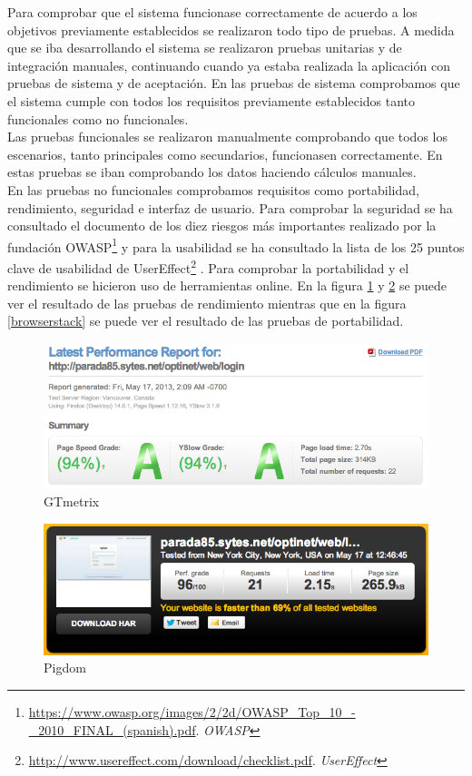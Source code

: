 \documentclass[a4paper,12pt]{article}
\begin{document}
\noindent Para comprobar que el sistema funcionase correctamente de acuerdo a los objetivos previamente establecidos se realizaron todo tipo de pruebas. A medida que se iba desarrollando el sistema se realizaron pruebas unitarias y de integración manuales, continuando cuando ya estaba realizada la aplicación con pruebas de sistema y de aceptación. En las pruebas de sistema comprobamos que el sistema cumple con todos los requisitos previamente establecidos tanto funcionales como no funcionales.\\
Las pruebas funcionales se realizaron manualmente comprobando que todos los escenarios, tanto principales como secundarios, funcionasen correctamente. En estas pruebas se iban comprobando los datos haciendo cálculos manuales.\\
En las pruebas no funcionales comprobamos requisitos como portabilidad, rendimiento, seguridad e interfaz de usuario. Para comprobar la seguridad se ha consultado el documento de los diez riesgos más importantes realizado por la fundación OWASP\footnote{\url{https://www.owasp.org/images/2/2d/OWASP_Top_10_-_2010_FINAL_(spanish).pdf}. \textit{OWASP}} y para la usabilidad se ha consultado la lista de los 25 puntos clave de usabilidad de UserEffect\footnote{\url{http://www.usereffect.com/download/checklist.pdf}. \textit{UserEffect}} . Para comprobar la portabilidad y el rendimiento se hicieron uso de herramientas online. En la figura \ref{gtmetrix} y \ref{pigdom} se puede ver el resultado de las pruebas de rendimiento mientras que en la figura \ref{browserstack} se puede ver el resultado de las pruebas de portabilidad.\\

\begin{figure}[!ht]
  \centering
    \includegraphics[scale=0.5]{ren}
  \caption{GTmetrix}
\label{gtmetrix}
\end{figure}

\begin{figure}[!ht]
  \centering
    \includegraphics[scale=0.58]{renotro}
  \caption{Pigdom}
\label{pigdom}
\end{figure}
\end{document}
